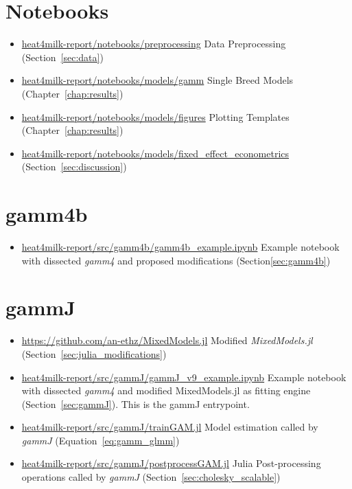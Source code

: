 \section*{Notebooks}
\begin{itemize}
    \item \url{heat4milk-report/notebooks/preprocessing} Data Preprocessing (Section~\ref{sec:data})
    \item \url{heat4milk-report/notebooks/models/gamm} Single Breed Models (Chapter~\ref{chap:results})
    \item \url{heat4milk-report/notebooks/models/figures} Plotting Templates (Chapter~\ref{chap:results})
    \item \url{heat4milk-report/notebooks/models/fixed_effect_econometrics} (Section~\ref{sec:discussion})
\end{itemize}

\section*{gamm4b}
\begin{itemize}
    \item \url{heat4milk-report/src/gamm4b/gamm4b_example.ipynb} Example notebook with dissected \textit{gamm4} and proposed modifications (Section\ref{sec:gamm4b})
\end{itemize}

\section*{gammJ}
\begin{itemize}
    \item \href{https://github.com/an-ethz/MixedModels.jl}{https://github.com/an-ethz/MixedModels.jl} Modified \textit{MixedModels.jl} (Section~\ref{sec:julia_modifications})
    \item \url{heat4milk-report/src/gammJ/gammJ_v9_example.ipynb} Example notebook with dissected \textit{gamm4} and modified MixedModels.jl as fitting engine (Section~\ref{sec:gammJ}). This is the gammJ entrypoint.
    \item \url{heat4milk-report/src/gammJ/trainGAM.jl} Model estimation called by \textit{gammJ} (Equation~\ref{eq:gamm_glmm})
    \item \url{heat4milk-report/src/gammJ/postprocessGAM.jl} Julia Post-processing operations called by \textit{gammJ} (Section~\ref{sec:cholesky_scalable})
\end{itemize}



